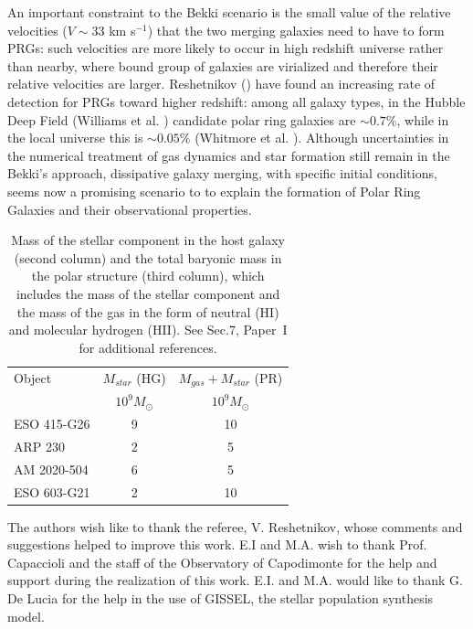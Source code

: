 \documentclass{aa}
\begin{document}
An important constraint to the Bekki scenario is the small value of the
relative velocities ($V \sim 33$ km s$^{-1}$) that the two merging
galaxies need to have to form PRGs: such velocities are more likely to
occur in high redshift universe rather than nearby,  where bound group of
galaxies are virialized and therefore their relative 
velocities are larger. Reshetnikov (\cite{Resh97}) have found
an increasing rate of detection for PRGs toward higher redshift:
among all galaxy types, in the Hubble Deep Field (Williams et
al.  \cite{Williams95}) candidate polar ring galaxies are $\sim 0.7\%$,
while in the local universe this is $\sim 0.05\%$ (Whitmore et
al. \cite{PRC}).       
Although uncertainties in the numerical treatment of gas dynamics and star 
formation still remain in the Bekki's approach, dissipative galaxy merging, 
with specific initial conditions, seems now a promising scenario to 
to explain the formation of Polar Ring Galaxies and
their observational properties.


\begin{table}
\caption[]{Mass of the stellar component in the host galaxy (second column) and
the total baryonic mass in the polar structure (third column), which includes 
the mass of the stellar component and the mass of the gas in the form of  
neutral  (HI) and molecular hydrogen (HII). See Sec.7, Paper~I for
additional references.}
\label{tab_MB}
\begin{tabular}{lcc}
\hline\hline
Object & $M_{star}$ (HG) & $M_{gas} + M_{star}$ (PR)\\
       &  $10^9 M_{\odot}$ & $10^9 M_{\odot}$\\
\hline
ESO 415-G26 & 9 & 10\\
ARP 230 & 2 & 5\\
AM 2020-504& 6 & 5\\
ESO 603-G21& 2 & 10\\
\hline
\end{tabular}
\end{table}                                                                     


\begin{acknowledgements}
The authors wish like to thank the referee, V. Reshetnikov, whose comments 
and suggestions helped to improve this work.
E.I and M.A. wish to thank Prof. Capaccioli and the staff of the
Observatory of Capodimonte for the help and support during the realization
of this work. E.I. and M.A. would like to thank G. De Lucia for the help
in the use of GISSEL, the stellar population synthesis model. 
\end{acknowledgements}
\end{document}
